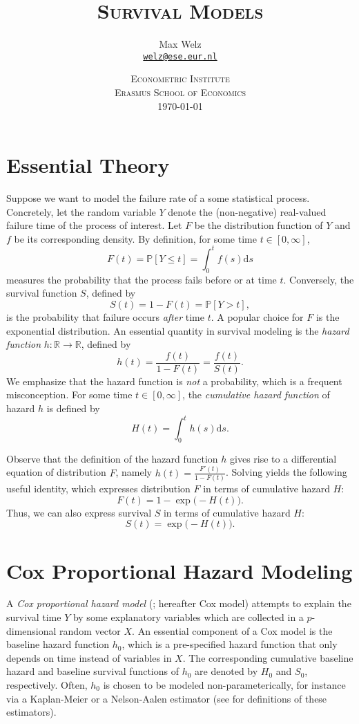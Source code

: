 \documentclass[11pt]{article}
\title{\textsc{Survival Models}}
\author{Max Welz \\
  \href{mailto:welz@ese.eur.nl}{\texttt{welz@ese.eur.nl}}}
\date{%
    \textsc{Econometric Institute\\ Erasmus School of Economics}\\[2ex]%
    \today}
\renewcommand{\P}{\mathbb{P}}
\newcommand{\R}{\mathbb{R}}
\renewcommand{\d}{\text{d}}
\begin{document}
\maketitle

\section{Essential Theory}
Suppose we want to model the failure rate of a some statistical process. Concretely, let the random variable $Y$ denote the (non-negative) real-valued failure time of the process of interest. Let $F$ be the distribution function of $Y$ and $f$ be its corresponding density. By definition, for some time $t\in[0, \infty]$,
\[
    F(t) = \P[Y \leq t]
    =
    \int_0^t f(s)\d s
\]
measures the probability that the process fails before or at time $t$. Conversely, the survival function $S$, defined by
\[
    S(t) = 1 - F(t) = \P[Y > t],
\]
is the probability that failure occurs \textit{after} time $t$. A popular choice for $F$ is the exponential distribution. An essential quantity in survival modeling is the \textit{hazard function} $h:\R\to\R$, defined by
\[
    h(t) = \frac{f(t)}{1-F(t)} = \frac{f(t)}{S(t)}.
\]
We emphasize that the hazard function is \textit{not} a probability, which is a frequent misconception. For some time $t\in[0, \infty]$, the \textit{cumulative hazard function} of hazard $h$ is defined by
\[
    H(t) = \int_0^t h(s) \d s.
\]

Observe that the definition of the hazard function $h$ gives rise to a differential equation of distribution $F$, namely $h(t) = \frac{F'(t)}{1-F(t)}$. Solving yields the following useful identity, which expresses distribution $F$ in terms of cumulative hazard $H$:
\[
    F(t) = 1 - \exp\big( - H(t) \big). 
\]
Thus, we can also express survival $S$ in terms of  cumulative hazard $H$:
\[
    S(t) = \exp \big( - H(t) \big).
\]

\section{Cox Proportional Hazard Modeling}
A \textit{Cox proportional hazard model} (\cite{cox1972}; hereafter Cox model) attempts to explain the survival time $Y$ by some explanatory variables which are collected in a $p$-dimensional random vector $X$. An essential component of a Cox model is the baseline hazard function $h_0$, which is a pre-specified hazard function that only depends on time instead of variables in $X$. The corresponding cumulative baseline hazard and baseline survival functions of $h_0$ are denoted by $H_0$ and $S_0$, respectively. Often, $h_0$ is chosen to be modeled non-parameterically, for instance via a Kaplan-Meier or a Nelson-Aalen estimator (see \cite{cameron2005} for definitions of these estimators).
\end{document}
